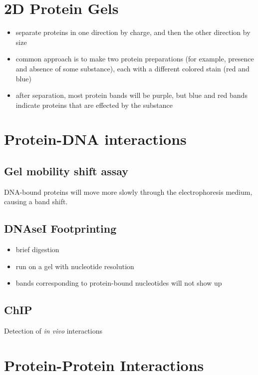 \documentclass[10pt]{article}
\newenvironment{mitemize}
{
  \begin{itemize}
  \setlength{\itemsep}{1pt}
  \setlength{\parskip}{0pt}
  \setlength{\parsep}{0pt}}{\end{itemize}
}
\begin{document}
\section*{2D Protein Gels}
\begin{mitemize}
  \item separate proteins in one direction by charge, and then the other direction by size
  \item common approach is to make two protein preparations (for example, presence and absence of some substance), each with a different colored stain (red and blue)
  \item after separation, most protein bands will be purple, but blue and red bands indicate proteins that are effected by the substance
\end{mitemize}

\section*{Protein-DNA interactions}

\subsection*{Gel mobility shift assay}
DNA-bound proteins will move more slowly through the electrophoresis medium, causing a band shift.

\subsection*{DNAseI Footprinting}
\begin{mitemize}
  \item brief digestion
  \item run on a gel with nucleotide resolution
  \item bands corresponding to protein-bound nucleotides will not show up
\end{mitemize}

\subsection*{ChIP}
Detection of \textit{in vivo} interactions


\section*{Protein-Protein Interactions}
\end{document}
